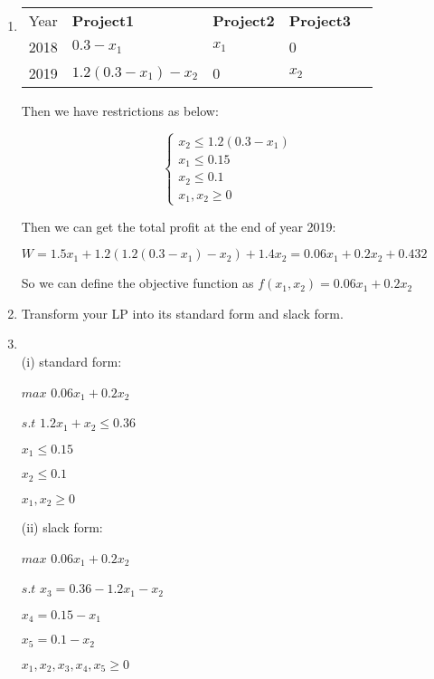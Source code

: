 \documentclass[12pt,a4paper]{article}
\makeatletter
\newtheorem*{solution}{Solution}
\theoremstyle{definition}
\renewenvironment{solution}[1][Solution] {\par\pushQED{\qed}\normalfont\topsep6\p@\@plus6\p@\relax\trivlist\item[\hskip\labelsep\bfseries#1\@addpunct{.}]\ignorespaces}{\popQED\endtrivlist\@endpefalse} \makeatother
\makeatother
\begin{document}
\begin{enumerate}
\begin{enumerate}
\begin{solution}
\begin{center}
				\begin{tabular}{|l|l|l|l|l}
					\cline{1-4}
					Year & \textbf{Project1} & \textbf{Project2} & \textbf{Project3} &  \\ \cline{1-4}
					2018 & $0.3-x_1$        & $x_1$        & 0        &  \\ \cline{1-4}
					2019 & $1.2(0.3-x_1)-x_2$        & 0        & $x_2$        &  \\ \cline{1-4}
				\end{tabular}
			
		\end{center}
	
	Then we have restrictions as below:
	
$$ \left\{
\begin{array}{lcl}
x_2\le1.2(0.3-x_1)       &      & \\
x_1\le0.15    &      & \\
x_2\le0.1\\
x_1,x_2\ge0
\end{array} \right. $$

Then we can get the total profit at the end of year 2019:

$W=1.5x_1+1.2(1.2(0.3-x_1)-x_2)+1.4x_2=0.06x_1+0.2x_2+0.432$

So we can define the objective function as
$f(x_1,x_2)=0.06x_1+0.2x_2$

	\end{solution}


    \item
    Transform your LP into its standard form and slack form.
	\begin{solution}
		~\\
		(i) standard form:
		\begin{center}
				$max$  $0.06x_1+0.2x_2$
				
				$s.t$ $1.2x_1+x_2\le0.36$
				
					  $x_1\le0.15$
					  
					  $x_2\le0.1$
					  
					  $x_1,x_2\ge0$
		\end{center}
	
	(ii) slack form:
		\begin{center}
		$max$  $0.06x_1+0.2x_2$
		
		$s.t$ $x_3=0.36-1.2x_1-x_2$
		
		$x_4=0.15-x_1$
		
		$x_5=0.1-x_2$
		
		$x_1,x_2,x_3,x_4,x_5\ge0$
	\end{center}
	

\end{solution}
\end{enumerate}
\end{enumerate}
\end{document}
